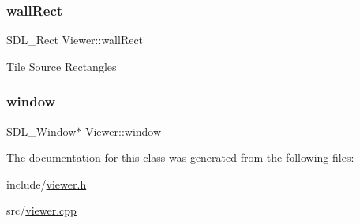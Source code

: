 \mbox{\label{classViewer_a5475b38369314f06da131e7ca558dec0}} 
\subsubsection{\texorpdfstring{wall\+Rect}{wallRect}}
{\footnotesize\ttfamily S\+D\+L\+\_\+\+Rect Viewer\+::wall\+Rect}

Tile Source Rectangles \mbox{\label{classViewer_a9f4bbe40df531d56d30098af395bfd42}} 
\subsubsection{\texorpdfstring{window}{window}}
{\footnotesize\ttfamily S\+D\+L\+\_\+\+Window$\ast$ Viewer\+::window}



The documentation for this class was generated from the following files\+:\begin{DoxyCompactItemize}
\item 
include/\hyperlink{viewer_8h}{viewer.\+h}\item 
src/\hyperlink{viewer_8cpp}{viewer.\+cpp}\end{DoxyCompactItemize}
